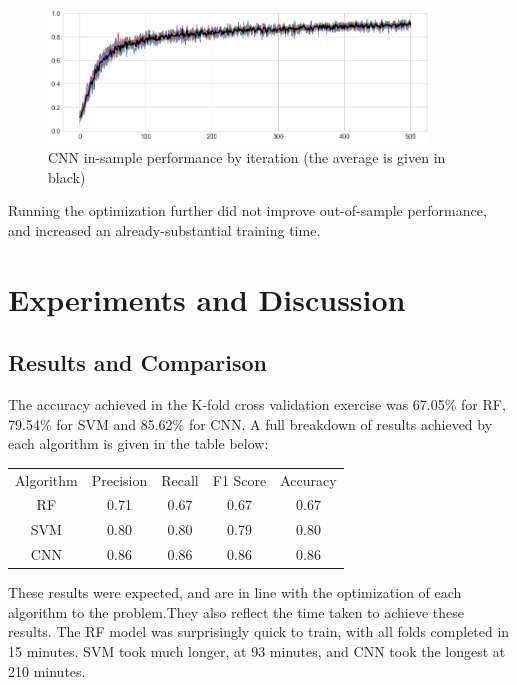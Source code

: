 \documentclass[12pt]{article}
\begin{document}
\begin{figure}[h]
  \caption{CNN in-sample performance by iteration (the average is given in black)}
  \label{img:cnntraining}
\centering
\includegraphics[width=0.9\textwidth]{images/training-progress.png}
\end{figure}

Running the optimization further did not improve out-of-sample performance, and increased an already-substantial training time.\\

\newpage
\section{Experiments and Discussion}
\subsection{Results and Comparison}

The accuracy achieved in the K-fold cross validation exercise was 67.05\% for RF, 79.54\% for SVM and 85.62\% for CNN. A full breakdown of results achieved by each algorithm is given in the table below:\\
\begin{center}
\begin{tabular}{ c c c c c }
 Algorithm & Precision & Recall & F1 Score & Accuracy\\ 
 RF & 0.71 & 0.67 & 0.67 & 0.67 \\  
SVM & 0.80 & 0.80 & 0.79 & 0.80\\
CNN & 0.86 & 0.86 & 0.86 & 0.86                    
\end{tabular}
\end{center}

These results were expected, and are in line with the optimization of each algorithm to the problem.They also reflect the time taken to achieve these results. The RF model was surprisingly quick to train, with all folds completed in 15 minutes. SVM took much longer, at 93 minutes, and CNN took the longest at 210 minutes.\\
\end{document}
